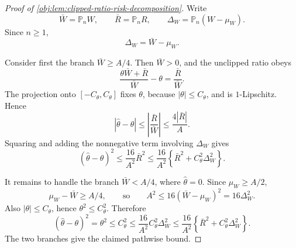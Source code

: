 \documentclass[11pt]{article}
\begin{document}
\begin{proof}[Proof of \cref{obj:lem:clipped-ratio-risk-decomposition}]
Write
\[
\bar W=\mathbb P_n W,\qquad
\bar R=\mathbb P_n R,\qquad
\Delta_W=\mathbb P_n(W-\mu_W).
\]
Since \(n\ge1\),
\[
\Delta_W=\bar W-\mu_W.
\]

Consider first the branch \(\bar W\ge A/4\). Then \(\bar W>0\), and the
unclipped ratio obeys
\[
\frac{\theta\bar W+\bar R}{\bar W}-\theta=\frac{\bar R}{\bar W}.
\]
The projection onto \([-C_\theta,C_\theta]\) fixes \(\theta\), because
\(|\theta|\le C_\theta\), and is \(1\)-Lipschitz. Hence
\[
|\widehat\theta-\theta|
\le
\left|\frac{\bar R}{\bar W}\right|
\le
\frac{4|\bar R|}{A}.
\]
Squaring and adding the nonnegative term involving \(\Delta_W\) gives
\[
(\widehat\theta-\theta)^2
\le
\frac{16}{A^2}\bar R^2
\le
\frac{16}{A^2}
\left\{\bar R^2+C_\theta^2\Delta_W^2\right\}.
\]

It remains to handle the branch \(\bar W<A/4\), where \(\widehat\theta=0\).
Since \(\mu_W\ge A/2\),
\[
\mu_W-\bar W\ge A/4,
\qquad\text{so}\qquad
A^2\le16(\bar W-\mu_W)^2=16\Delta_W^2.
\]
Also \(|\theta|\le C_\theta\), hence \(\theta^2\le C_\theta^2\). Therefore
\[
(\widehat\theta-\theta)^2
=
\theta^2
\le
C_\theta^2
\le
\frac{16}{A^2}C_\theta^2\Delta_W^2
\le
\frac{16}{A^2}\left\{\bar R^2+C_\theta^2\Delta_W^2\right\}.
\]
The two branches give the claimed pathwise bound. %
\end{proof}
\end{document}
